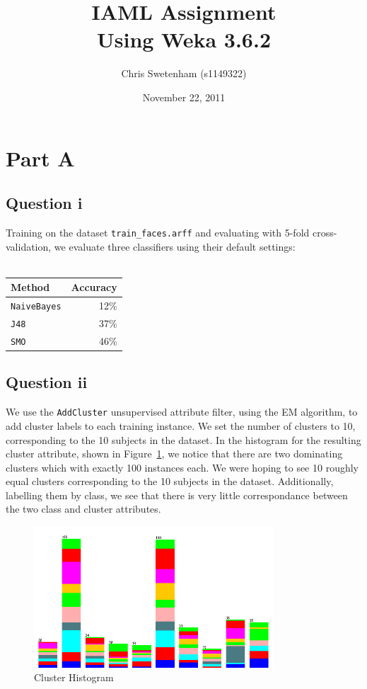 \documentclass[a4paper]{article}
\author{Chris Swetenham (s1149322)}
\title{IAML Assignment \\ \large Using Weka 3.6.2}
\date{November 22, 2011}
\begin{document}
\maketitle
\clearpage

\section*{Part A}

\subsection*{Question i}
Training on the dataset {\tt train\_faces.arff} and evaluating with 5-fold cross-validation, we evaluate three classifiers using their default settings: \\
\\
\begin{tabular}{lr}
Method & Accuracy \\
\hline
{\tt NaiveBayes} & 12\% \\
{\tt J48} & 37\% \\
{\tt SMO} & 46\%
\end{tabular}

\subsection*{Question ii}
We use the {\tt AddCluster} unsupervised attribute filter, using the EM algorithm, to add cluster labels to each training instance. We set the number of clusters to 10, corresponding to the 10 subjects in the dataset.
In the histogram for the resulting cluster attribute, shown in Figure~\ref{fig:a2img1}, we notice that there are two dominating clusters which with exactly 100 instances each. We were hoping to see 10 roughly equal clusters corresponding to the 10 subjects in the dataset. Additionally, labelling them by class, we see that there is very little correspondance between the two class and cluster attributes.

\begin{figure}[!htbp]
\centering
\includegraphics[width=0.8\textwidth]{A2-img1-clusters-cropped.png}
\caption{Cluster Histogram}
\label{fig:a2img1}
\end{figure}
\end{document}
